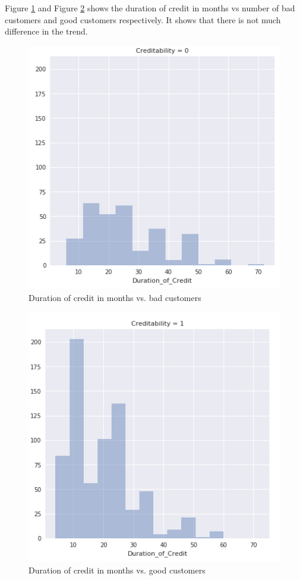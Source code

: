 \documentclass[sigconf]{acmart}
\begin{document}
Figure \ref{fig:Figure11} and Figure \ref{fig:Figure12} shows the duration of credit in months vs number of bad customers and good customers respectively. It shows that there is not much difference in the trend.

\begin{figure}[htb]
  \centering
  \includegraphics[width=1.0\columnwidth]{images/Figure11.png}
  \caption{Duration of credit in months vs. bad customers
  \cite{german-credit-sri-sai}}
  \label{fig:Figure11} 
\end{figure}

\begin{figure}[htb]
  \centering
  \includegraphics[width=1.0\columnwidth]{images/Figure12.png}
  \caption{Duration of credit in months vs. good customers
  \cite{german-credit-sri-sai}}
  \label{fig:Figure12} 
\end{figure}
\end{document}
